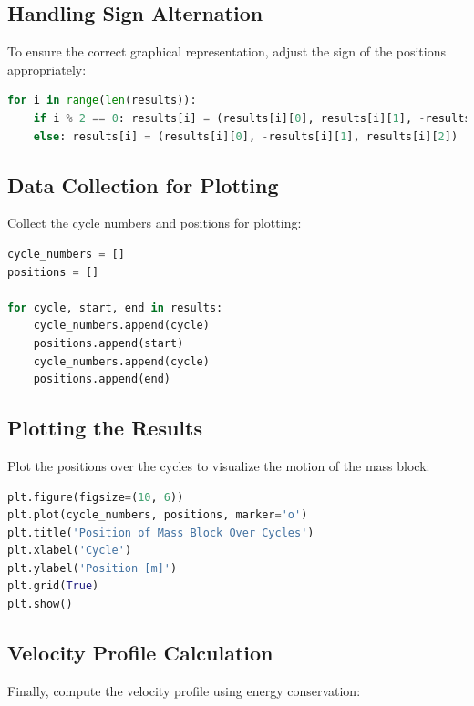 \documentclass[12pt, a4paper, oneside]{report}
\begin{document}
\subsection*{Handling Sign Alternation}

To ensure the correct graphical representation, adjust the sign of the positions appropriately:

\begin{lstlisting}[language=Python, caption={Handling sign alternation for plotting}]
for i in range(len(results)):
    if i % 2 == 0: results[i] = (results[i][0], results[i][1], -results[i][2])
    else: results[i] = (results[i][0], -results[i][1], results[i][2])
\end{lstlisting}

\subsection*{Data Collection for Plotting}

Collect the cycle numbers and positions for plotting:

\begin{lstlisting}[language=Python, caption={Collecting data for plotting}]
cycle_numbers = []
positions = []

for cycle, start, end in results:
    cycle_numbers.append(cycle)
    positions.append(start)
    cycle_numbers.append(cycle)
    positions.append(end)
\end{lstlisting}

\subsection*{Plotting the Results}

Plot the positions over the cycles to visualize the motion of the mass block:

\begin{lstlisting}[language=Python, caption={Plotting the positions over cycles}]
plt.figure(figsize=(10, 6))
plt.plot(cycle_numbers, positions, marker='o')
plt.title('Position of Mass Block Over Cycles')
plt.xlabel('Cycle')
plt.ylabel('Position [m]')
plt.grid(True)
plt.show()
\end{lstlisting}

\subsection*{Velocity Profile Calculation}

Finally, compute the velocity profile using energy conservation:
\end{document}
